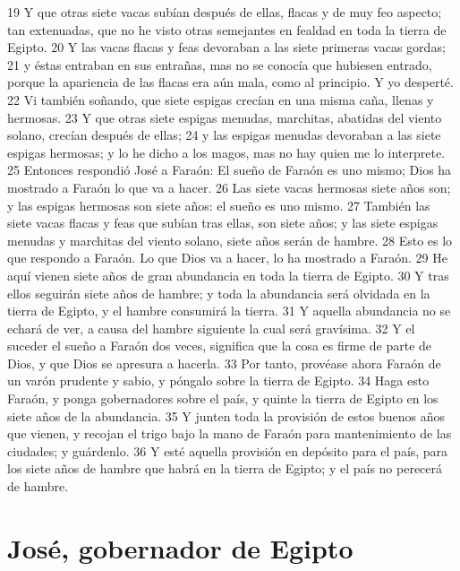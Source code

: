 19 Y que otras siete vacas subían después de ellas, flacas y de muy feo aspecto; tan extenuadas, que no he visto otras semejantes en fealdad en toda la tierra de Egipto.
20 Y las vacas flacas y feas devoraban a las siete primeras vacas gordas;
21 y éstas entraban en sus entrañas, mas no se conocía que hubiesen entrado, porque la apariencia de las flacas era aún mala, como al principio. Y yo desperté.
22 Vi también soñando, que siete espigas crecían en una misma caña, llenas y hermosas.
23 Y que otras siete espigas menudas, marchitas, abatidas del viento solano, crecían después de ellas;
24 y las espigas menudas devoraban a las siete espigas hermosas; y lo he dicho a los magos, mas no hay quien me lo interprete.
25 Entonces respondió José a Faraón: El sueño de Faraón es uno mismo; Dios ha mostrado a Faraón lo que va a hacer.
26 Las siete vacas hermosas siete años son; y las espigas hermosas son siete años: el sueño es uno mismo.
27 También las siete vacas flacas y feas que subían tras ellas, son siete años; y las siete espigas menudas y marchitas del viento solano, siete años serán de hambre.
28 Esto es lo que respondo a Faraón. Lo que Dios va a hacer, lo ha mostrado a Faraón.
29 He aquí vienen siete años de gran abundancia en toda la tierra de Egipto.
30 Y tras ellos seguirán siete años de hambre; y toda la abundancia será olvidada en la tierra de Egipto, y el hambre consumirá la tierra.
31 Y aquella abundancia no se echará de ver, a causa del hambre siguiente la cual será gravísima.
32 Y el suceder el sueño a Faraón dos veces, significa que la cosa es firme de parte de Dios, y que Dios se apresura a hacerla.
33 Por tanto, provéase ahora Faraón de un varón prudente y sabio, y póngalo sobre la tierra de Egipto.
34 Haga esto Faraón, y ponga gobernadores sobre el país, y quinte la tierra de Egipto en los siete años de la abundancia.
35 Y junten toda la provisión de estos buenos años que vienen, y recojan el trigo bajo la mano de Faraón para mantenimiento de las ciudades; y guárdenlo.
36 Y esté aquella provisión en depósito para el país, para los siete años de hambre que habrá en la tierra de Egipto; y el país no perecerá de hambre.

\section*{José, gobernador de Egipto}

